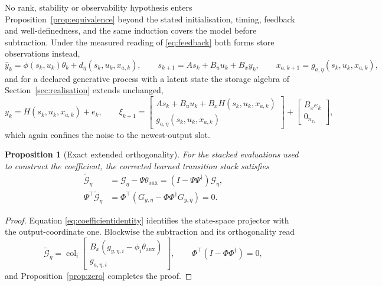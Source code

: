 \documentclass[11pt,a4paper]{article}
\newcommand{\col}{\operatorname{col}}
\newtheorem{proposition}{Proposition}
\theoremstyle{remark}
\begin{document}
No rank, stability or observability hypothesis enters Proposition~\ref{prop:equivalence} beyond
the stated initialisation, timing, feedback and well-definedness, and the same induction covers
the model before subtraction. Under the measured reading of \eqref{eq:feedback} both forms store
observations instead,
\begin{equation*}
\hat y_k=\phi(s_k,u_k)\theta_b+d_\eta(s_k,u_k,x_{a,k}),\qquad
s_{k+1}=As_k+B_uu_k+B_xy_k,\qquad
x_{a,k+1}=g_{a,\eta}(s_k,u_k,x_{a,k}),
\end{equation*}
and for a declared generative process with a latent state the storage algebra of
Section~\ref{sec:realisation} extends unchanged,
\begin{equation*}
y_k=H(s_k,u_k,x_{a,k})+e_k,\qquad
\xi_{k+1}=\begin{bmatrix}As_k+B_uu_k+B_xH(s_k,u_k,x_{a,k})\\g_{a,\eta}(s_k,u_k,x_{a,k})\end{bmatrix}
+\begin{bmatrix}B_xe_k\\0_{n_{x_a}}\end{bmatrix},
\end{equation*}
which again confines the noise to the newest-output slot.

\begin{proposition}[Exact extended orthogonality]\label{prop:projection}
For the stacked evaluations used to construct the coefficient, the corrected learned transition
stack satisfies
\begin{equation}\label{eq:finalidentity}
\boxed{\begin{aligned}
\widetilde{\mathcal G}_\eta&=\mathcal G_\eta-\Psi\theta_{\mathrm{aux}}
=(I-\Psi\Psi^\dagger)\mathcal G_\eta,\\
\Psi^\top\widetilde{\mathcal G}_\eta
&=\Phi^\top(G_{y,\eta}-\Phi\Phi^\dagger G_{y,\eta})=0.
\end{aligned}}
\end{equation}
\end{proposition}

\begin{proof}
Equation \eqref{eq:coefficientidentity} identifies the state-space projector with the
output-coordinate one. Blockwise the subtraction and its orthogonality read
\begin{equation*}
\widetilde{\mathcal G}_\eta
=\col_i\begin{bmatrix}B_x(g_{y,\eta,i}-\phi_i\theta_{\mathrm{aux}})\\g_{a,\eta,i}\end{bmatrix},
\qquad\Phi^\top(I-\Phi\Phi^\dagger)=0,
\end{equation*}
and Proposition~\ref{prop:zero} completes the proof.
\end{proof}
\end{document}
